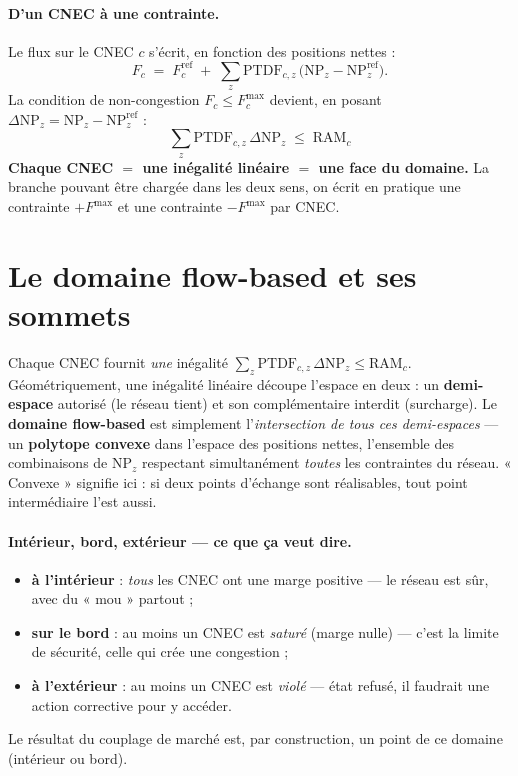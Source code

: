 \documentclass[11pt,a4paper]{article}
\newcommand{\NP}{\mathrm{NP}}
\newcommand{\PTDF}{\mathrm{PTDF}}
\newcommand{\RAM}{\mathrm{RAM}}
\newcommand{\Fmax}{F^{\max}}
\newcommand{\Fref}{F^{\mathrm{ref}}}
\begin{document}
\paragraph{D'un CNEC à une contrainte.}
Le flux sur le CNEC $c$ s'écrit, en fonction des positions nettes :
\[
  F_c \;=\; \Fref_c \;+\; \sum_z \PTDF_{c,z}\,\bigl(\NP_z - \NP_z^{\mathrm{ref}}\bigr).
\]
La condition de non-congestion $F_c \le \Fmax_c$ devient, en posant
$\Delta\NP_z = \NP_z - \NP_z^{\mathrm{ref}}$ :
\[
  \boxed{\;\sum_z \PTDF_{c,z}\,\Delta\NP_z \;\le\; \RAM_c\;}
\]
\textbf{Chaque CNEC $=$ une inégalité linéaire $=$ une face du domaine.}
La branche pouvant être chargée dans les deux sens, on écrit en pratique
une contrainte $+\Fmax$ et une contrainte $-\Fmax$ par CNEC.

\section{Le domaine flow-based et ses sommets}

Chaque CNEC fournit \emph{une} inégalité $\sum_z \PTDF_{c,z}\,\Delta\NP_z \le
\RAM_c$. Géométriquement, une inégalité linéaire découpe l'espace en deux :
un \textbf{demi-espace} autorisé (le réseau tient) et son complémentaire
interdit (surcharge). Le \textbf{domaine flow-based} est simplement
l'\emph{intersection de tous ces demi-espaces} — un \textbf{polytope convexe}
dans l'espace des positions nettes, l'ensemble des combinaisons de $\NP_z$
respectant simultanément \emph{toutes} les contraintes du réseau. « Convexe »
signifie ici : si deux points d'échange sont réalisables, tout point
intermédiaire l'est aussi.

\paragraph{Intérieur, bord, extérieur — ce que ça veut dire.}
\begin{itemize}[nosep,leftmargin=1.4em]
  \item \textbf{à l'intérieur} : \emph{tous} les CNEC ont une marge positive
        — le réseau est sûr, avec du « mou » partout ;
  \item \textbf{sur le bord} : au moins un CNEC est \emph{saturé} (marge nulle)
        — c'est la limite de sécurité, celle qui crée une congestion ;
  \item \textbf{à l'extérieur} : au moins un CNEC est \emph{violé} — état
        refusé, il faudrait une action corrective pour y accéder.
\end{itemize}
Le résultat du couplage de marché est, par construction, un point de ce
domaine (intérieur ou bord).
\end{document}
